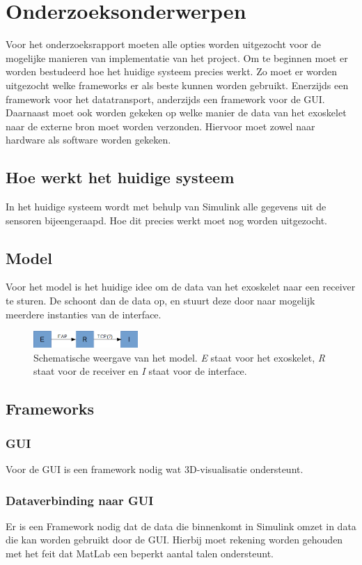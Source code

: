\section{Onderzoeksonderwerpen}
Voor het onderzoeksrapport moeten alle opties worden uitgezocht voor de mogelijke manieren van implementatie van het project. Om	 te beginnen moet er worden bestudeerd hoe het huidige systeem precies werkt. Zo moet er worden uitgezocht welke frameworks er als beste kunnen worden gebruikt. Enerzijds een framework voor het datatransport, anderzijds een framework voor de GUI. Daarnaast moet ook worden gekeken op welke manier de data van het exoskelet naar de externe bron moet worden verzonden. Hiervoor moet zowel naar hardware als software worden gekeken.
\subsection{Hoe werkt het huidige systeem}
In het huidige systeem wordt met behulp van Simulink alle gegevens uit de sensoren bijeengeraapd. Hoe dit precies werkt moet nog worden uitgezocht. 
\subsection{Model}
Voor het model is het huidige idee om de data van het exoskelet naar een receiver te sturen. De schoont dan de data op, en stuurt deze door naar mogelijk meerdere instanties van de interface.
\begin{figure}[!ht]
	\centering
	\includegraphics[width=150px]{ERIModel}
	\caption{Schematische weergave van het model. \textit{E} staat voor het exoskelet, \textit{R} staat voor de receiver en \textit{I} staat voor de interface.}
\end{figure}
\subsection{Frameworks}
\subsubsection{GUI}
Voor de GUI is een framework nodig wat 3D-visualisatie ondersteunt.
\subsubsection{Dataverbinding naar GUI}
Er is een Framework nodig dat de data die binnenkomt in Simulink omzet in data die kan worden gebruikt door de GUI. Hierbij moet rekening worden gehouden met het feit dat MatLab een beperkt aantal talen ondersteunt.
